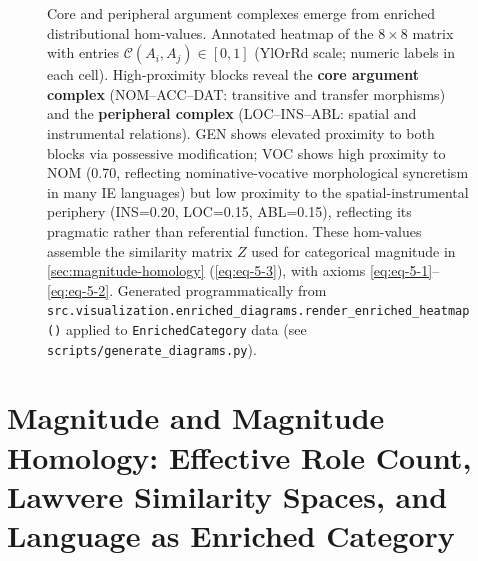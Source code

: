 \documentclass[
]{article}
\makeatletter
\newcommand*\pandocbounded[1]{%
  \sbox\pandoc@box{#1}%
  \Gscale@div\@tempa{\textheight}{\dimexpr\ht\pandoc@box+\dp\pandoc@box\relax}%
  \Gscale@div\@tempb{\linewidth}{\wd\pandoc@box}%
  \ifdim\@tempb\p@<\@tempa\p@\let\@tempa\@tempb\fi%
  \ifdim\@tempa\p@<\p@\scalebox{\@tempa}{\usebox\pandoc@box}%
  \else\usebox{\pandoc@box}%
  \fi%
}
\makeatother
\begin{document}
\begin{figure}
\centering
\pandocbounded{\includegraphics[keepaspectratio,alt={Core and peripheral argument complexes emerge from enriched distributional hom-values. Annotated heatmap of the 8 \textbackslash times 8 matrix with entries \textbackslash mathcal\{C\}(A\_i,A\_j) \textbackslash in \[0,1\] (YlOrRd scale; numeric labels in each cell). High-proximity blocks reveal the core argument complex (NOM--ACC--DAT: transitive and transfer morphisms) and the peripheral complex (LOC--INS--ABL: spatial and instrumental relations). GEN shows elevated proximity to both blocks via possessive modification; VOC shows high proximity to NOM (0.70, reflecting nominative-vocative morphological syncretism in many IE languages) but low proximity to the spatial-instrumental periphery (INS=0.20, LOC=0.15, ABL=0.15), reflecting its pragmatic rather than referential function. These hom-values assemble the similarity matrix Z used for categorical magnitude in  (), with axioms --. Generated programmatically from src.visualization.enriched\_diagrams.render\_enriched\_heatmap() applied to EnrichedCategory data (see scripts/generate\_diagrams.py).}]{../figures/enriched_hom_matrix.png}}
\caption{Core and peripheral argument complexes emerge from enriched
distributional hom-values. Annotated heatmap of the \(8 \times 8\)
matrix with entries \(\mathcal{C}(A_i,A_j) \in [0,1]\) (YlOrRd scale;
numeric labels in each cell). High-proximity blocks reveal the
\textbf{core argument complex} (NOM--ACC--DAT: transitive and transfer
morphisms) and the \textbf{peripheral complex} (LOC--INS--ABL: spatial
and instrumental relations). GEN shows elevated proximity to both blocks
via possessive modification; VOC shows high proximity to NOM (0.70,
reflecting nominative-vocative morphological syncretism in many IE
languages) but low proximity to the spatial-instrumental periphery
(INS=0.20, LOC=0.15, ABL=0.15), reflecting its pragmatic rather than
referential function. These hom-values assemble the similarity matrix
\(Z\) used for categorical magnitude in \autoref{sec:magnitude-homology}
(\autoref{eq:eq-5-3}), with axioms
\autoref{eq:eq-5-1}--\autoref{eq:eq-5-2}. Generated programmatically
from
\protect\texttt{src.visualization.enriched\_diagrams.render\_enriched\_heatmap()}
applied to \protect\texttt{EnrichedCategory} data (see
\protect\texttt{scripts/generate\_diagrams.py}).}\label{fig:enriched-heatmap}
\end{figure}

\newpage

\section{Magnitude and Magnitude Homology: Effective Role Count, Lawvere
Similarity Spaces, and Language as Enriched
Category}\label{sec:magnitude-homology}
\end{document}
